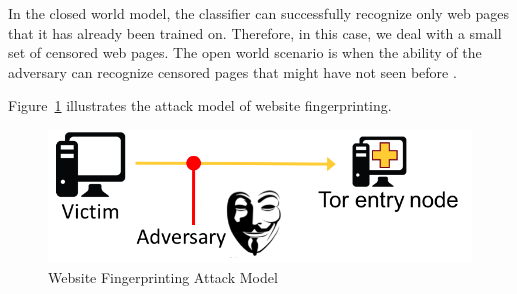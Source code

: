 In the closed world model, the classifier can successfully recognize only web pages that it has already been trained on. Therefore, in this case, we deal with a small set of censored web pages. The open world scenario is when the ability of the adversary can recognize censored pages that might have not seen before \cite{TorBlog}.


Figure~\ref{fig:attack} illustrates the attack model of website fingerprinting.

\begin{figure}[h]
\includegraphics[width=0.7\columnwidth]{figures/attack_model.png}
\centering
\caption{Website Fingerprinting Attack Model}
\label{fig:attack}
\end{figure}

